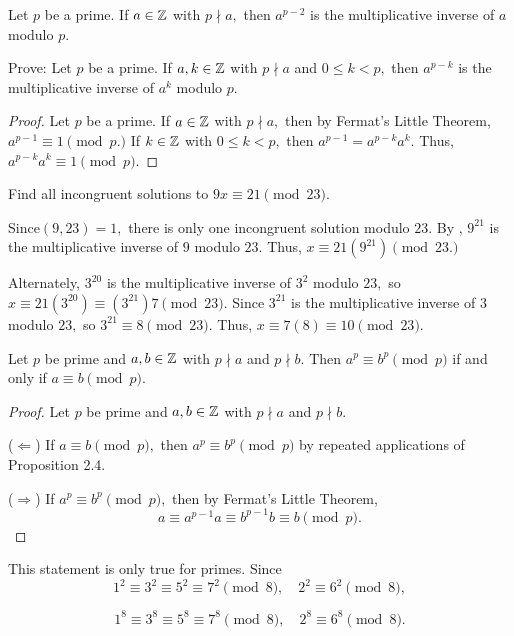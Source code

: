 \documentclass{ximera}
\begin{document}
\begin{corollary}\label{cor:inv-fermat}
  Let $p$ be a prime. If $a\in\mathbb Z$ with $p\nmid a,$ then $a^{p-2}$  is the multiplicative inverse of $a$ modulo $p$.
\end{corollary}

\begin{tps} Prove:
  Let $p$ be a prime. If $a,k\in\mathbb Z$ with $p\nmid a$ and $0\leq k<p,$ then $a^{p-k}$  is the multiplicative inverse of $a^k$ modulo $p$.
  
  
  \begin{proof}
    Let $p$ be a prime. If $a\in\mathbb Z$ with $p\nmid a,$ then by Fermat's Little Theorem, $a^{p-1}\equiv 1\pmod{p.}$ If $k\in\mathbb Z$ with $0\leq k<p,$ then $a^{p-1}=a^{p-k}a^k.$ Thus, $a^{p-k}a^k\equiv 1\pmod{p}.$
  \end{proof}
\end{tps}

\begin{example}
  Find all incongruent solutions to $9x\equiv 21\pmod{23}$.
  
  Since$(9,23)=1,$ there is only one  incongruent solution  modulo $23.$ By , $9^{21}$ is the multiplicative inverse of $9$ modulo ${23}$. Thus, $x\equiv 21(9^{21})\pmod{23.}$

  Alternately, $3^{20}$ is the multiplicative inverse of $3^2$ modulo ${23},$ so $x\equiv 21(3^{20})\equiv  (3^{21})7\pmod{23}.$ Since $3^{21}$ is the multiplicative inverse of $3$ modulo $23,$ so $3^{21}\equiv 8\pmod{23}.$ Thus, $x\equiv 7(8)\equiv 10\pmod{23}.$
\end{example}

\begin{example}
  Let $p$ be prime and $a,b\in\mathbb Z$ with $p\nmid a$ and $p\nmid b.$ Then $a^p\equiv b^p\pmod{p}$ if and only if $a\equiv b\pmod{p}$.
  
  
  \begin{proof}
    Let $p$ be prime and $a,b\in\mathbb Z$ with $p\nmid a$ and $p\nmid b.$ 
      
    ($\Leftarrow$) If $a\equiv  b\pmod{p},$ then $a^p\equiv b^p\pmod{p}$ by repeated applications of Proposition 2.4.
      
    ($\Rightarrow$)  If $a^p\equiv  b^p\pmod{p},$ then by Fermat's Little Theorem, 
      \[a\equiv a^{p-1}a\equiv b^{p-1}b\equiv b\pmod p. \]
  \end{proof}
  \begin{warning}
    This statement is only true for primes. Since
    \[
    1^2\equiv 3^2\equiv 5^2\equiv 7^2\pmod{8},\quad 2^2\equiv 6^2\pmod{8},
    \]
    
    \[
    1^8\equiv 3^8\equiv 5^8\equiv 7^8\pmod{8},\quad  2^8\equiv 6^8\pmod{8}.
    \]
  \end{warning}
\end{example}
\end{document}
